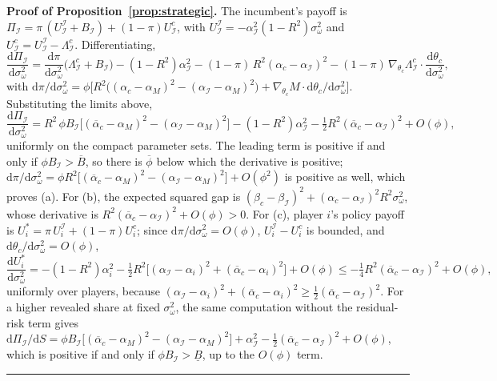 \documentclass[12pt,letterpaper]{article}
\newenvironment{proof}[1][Proof]{\noindent\textbf{#1.} }{\ \rule{0.5em}{0.5em}}
\begin{document}
\begin{proof}[Proof of Proposition~\ref{prop:strategic}]
The incumbent's payoff is $\Pi_{\mathcal I}=\pi\,(U_{\mathcal I}^{\mathcal I}+B_{\mathcal I})+(1-\pi)U_{\mathcal I}^c$, with $U_{\mathcal I}^{\mathcal I}=-\alpha_{\mathcal I}^2(1-R^2)\sigma_\omega^2$ and $U_{\mathcal I}^c=U_{\mathcal I}^{\mathcal I}-\Lambda_{\mathcal I}^c$. Differentiating,
\[
\frac{\mathrm{d}\Pi_{\mathcal I}}{\mathrm{d}\sigma_\omega^2}=\frac{\mathrm{d}\pi}{\mathrm{d}\sigma_\omega^2}\big(\Lambda_{\mathcal I}^c+B_{\mathcal I}\big)-(1-R^2)\alpha_{\mathcal I}^2-(1-\pi)\,R^2(\alpha_c-\alpha_{\mathcal I})^2-(1-\pi)\,\nabla_{\theta_c}\Lambda_{\mathcal I}^c\cdot\frac{\mathrm{d}\theta_c}{\mathrm{d}\sigma_\omega^2},
\]
with $\mathrm{d}\pi/\mathrm{d}\sigma_\omega^2=\phi\big[R^2\big((\alpha_c-\alpha_M)^2-(\alpha_{\mathcal I}-\alpha_M)^2\big)+\nabla_{\theta_c}M\cdot\mathrm{d}\theta_c/\mathrm{d}\sigma_\omega^2\big]$. Substituting the limits above,
\[
\frac{\mathrm{d}\Pi_{\mathcal I}}{\mathrm{d}\sigma_\omega^2}=R^2\,\phi B_{\mathcal I}\big[(\overline{\alpha}_c-\alpha_M)^2-(\alpha_{\mathcal I}-\alpha_M)^2\big]-(1-R^2)\alpha_{\mathcal I}^2-\tfrac12R^2(\overline{\alpha}_c-\alpha_{\mathcal I})^2+O(\phi),
\]
uniformly on the compact parameter sets. The leading term is positive if and only if $\phi B_{\mathcal I}>\overline{B}$, so there is $\overline{\phi}$ below which the derivative is positive; $\mathrm{d}\pi/\mathrm{d}\sigma_\omega^2=\phi R^2\big[(\overline{\alpha}_c-\alpha_M)^2-(\alpha_{\mathcal I}-\alpha_M)^2\big]+O(\phi^2)$ is positive as well, which proves (a). For (b), the expected squared gap is $(\beta_c-\beta_{\mathcal I})^2+(\alpha_c-\alpha_{\mathcal I})^2R^2 \sigma_\omega^2$, whose derivative is $R^2(\overline{\alpha}_c-\alpha_{\mathcal I})^2+O(\phi)>0$. For (c), player $i$'s policy payoff is $U_i^*=\pi\,U_i^{\mathcal I}+(1-\pi)U_i^c$; since $\mathrm{d}\pi/\mathrm{d}\sigma_\omega^2=O(\phi)$, $U_i^{\mathcal I}-U_i^c$ is bounded, and $\mathrm{d}\theta_c/\mathrm{d}\sigma_\omega^2=O(\phi)$,
\[
\frac{\mathrm{d}U_i^*}{\mathrm{d}\sigma_\omega^2}=-(1-R^2)\alpha_i^2-\tfrac12R^2\big[(\alpha_{\mathcal I}-\alpha_i)^2+(\overline{\alpha}_c-\alpha_i)^2\big]+O(\phi)\le-\tfrac14R^2(\overline{\alpha}_c-\alpha_{\mathcal I})^2+O(\phi),
\]
uniformly over players, because $(\alpha_{\mathcal I}-\alpha_i)^2+(\overline{\alpha}_c-\alpha_i)^2\ge\tfrac12(\overline{\alpha}_c-\alpha_{\mathcal I})^2$. For a higher revealed share at fixed $\sigma_\omega^2$, the same computation without the residual-risk term gives $\mathrm{d}\Pi_{\mathcal I}/\mathrm{d}S=\phi B_{\mathcal I}\big[(\overline{\alpha}_c-\alpha_M)^2-(\alpha_{\mathcal I}-\alpha_M)^2\big]+\alpha_{\mathcal I}^2-\tfrac12(\overline{\alpha}_c-\alpha_{\mathcal I})^2+O(\phi)$, which is positive if and only if $\phi B_{\mathcal I}>\underline B$, up to the $O(\phi)$ term.
\end{proof}
\end{document}
